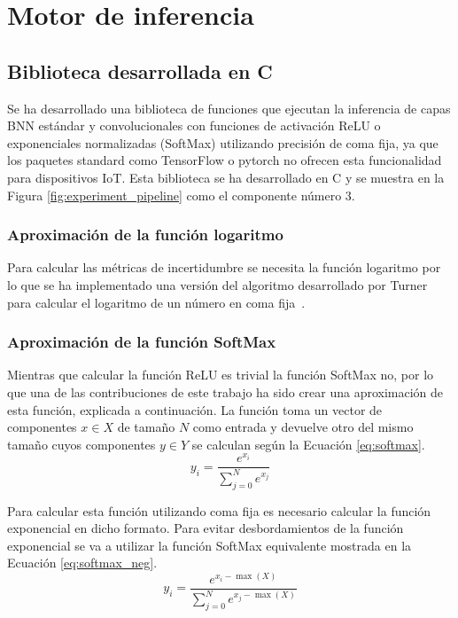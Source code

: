 \chapter{Motor de inferencia} \label{ch:motor_inferencia}

\section{Biblioteca desarrollada en C}

Se ha desarrollado una biblioteca de funciones que ejecutan la inferencia de capas BNN estándar y convolucionales con funciones de activación ReLU o exponenciales normalizadas (SoftMax) utilizando precisión de coma fija, ya que los paquetes standard como TensorFlow o pytorch no ofrecen esta funcionalidad para dispositivos IoT. Esta biblioteca se ha desarrollado en C y se muestra en la Figura \ref{fig:experiment_pipeline} como el componente número 3.

\subsection{Aproximación de la función logaritmo}

Para calcular las métricas de incertidumbre se necesita la función logaritmo por lo que se ha implementado una versión del algoritmo desarrollado por Turner para calcular el logaritmo de un número en coma fija~\cite{binary_log}.

\subsection{Aproximación de la función SoftMax}

Mientras que calcular la función ReLU es trivial la función SoftMax no, por lo que una de las contribuciones de este trabajo ha sido crear una aproximación de esta función, explicada a continuación. La función toma un vector de componentes $x \in X$ de tamaño $N$ como entrada y devuelve otro del mismo tamaño cuyos componentes $y\in Y$ se calculan según la Ecuación \ref{eq:softmax}.
\begin{equation} \label{eq:softmax}
y_i = \dfrac{e^{x_i}}{\sum_{j = 0}^N e^{x_j}}
\end{equation}

Para calcular esta función utilizando coma fija es necesario calcular la función exponencial en dicho formato. Para evitar desbordamientos de la función exponencial se va a utilizar la función SoftMax equivalente mostrada en la Ecuación \ref{eq:softmax_neg}.
\begin{equation} \label{eq:softmax_neg}
y_i = \dfrac{e^{x_i - \max(X)}}{\sum_{j = 0}^N e^{x_j - \max(X)}}
\end{equation}

